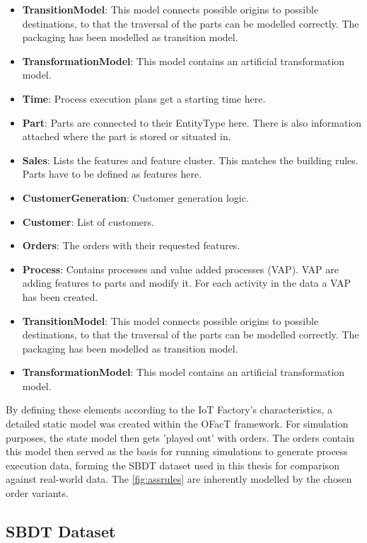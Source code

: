 \begin{itemize}
  \item \textbf{TransitionModel}: This model connects possible origins to possible destinations, to that the traversal of the parts can be modelled correctly. The packaging has been modelled as transition model.
  \item \textbf{TransformationModel}: This model contains an artificial transformation model.
  \item \textbf{Time}: Process execution plans get a starting time here.
  \item \textbf{Part}: Parts are connected to their EntityType here. There is also information attached where the part is stored or situated in.
  \item \textbf{Sales}: Lists the features and feature cluster. This matches the building rules. Parts have to be defined as features here.
  \item \textbf{CustomerGeneration}: Customer generation logic.
  \item \textbf{Customer}: List of customers.
  \item \textbf{Orders}: The orders with their requested features.
  \item \textbf{Process}: Contains processes and value added processes (VAP). VAP are adding features to parts and modify it. For each activity in the data a VAP has been created.
  \item \textbf{TransitionModel}: This model connects possible origins to possible destinations, to that the traversal of the parts can be modelled correctly. The packaging has been modelled as transition model.
  \item \textbf{TransformationModel}: This model contains an artificial transformation model.
\end{itemize}


By defining these elements according to the IoT Factory's characteristics, a detailed static model was created within the OFacT framework. For simulation purposes, the state model then gets 'played out' with orders. The orders contain this model then served as the basis for running simulations to generate process execution data, forming the SBDT dataset used in this thesis for comparison against real-world data. The \autoref{fig:assrules} are inherently modelled by the chosen order variants.

\subsection*{SBDT Dataset}

